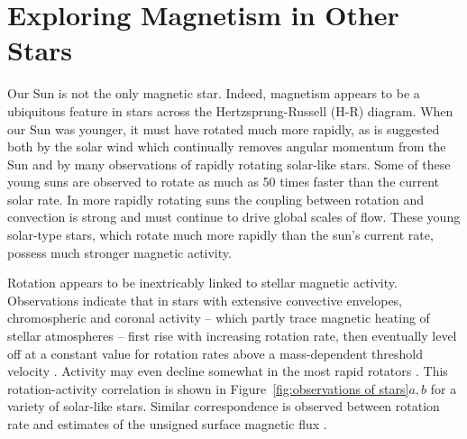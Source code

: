 \section{Exploring Magnetism in Other Stars} 
Our Sun is not the only magnetic star.  Indeed, magnetism appears to be a
ubiquitous feature in stars across the Hertzsprung-Russell (H-R) diagram.  
When our Sun was younger, it must have rotated much more
rapidly, as is suggested both by the solar wind which continually removes
angular momentum from the Sun and by many observations of rapidly
rotating solar-like stars.  Some of these young suns are observed to
rotate as much as 50 times faster than the current solar rate.  
In more rapidly rotating suns the
coupling between rotation and convection is strong and must continue to drive 
global scales of flow.  These young solar-type stars, which rotate
much more rapidly than the sun's current rate, possess much stronger
magnetic activity.   


Rotation appears to be inextricably linked to stellar magnetic activity.
Observations indicate that in stars with extensive convective envelopes,
chromospheric and coronal activity -- which partly trace magnetic heating
of stellar atmospheres -- first rise with increasing rotation rate, then
eventually level off at a constant value for rotation rates above a
mass-dependent threshold velocity \citep[e.g.,][]{Noyes_et_al_1984a, 
Patten&Simon_1996, Delfosse_et_al_1998, Pizzolato_et_al_2003}. Activity may even decline somewhat in the
most rapid rotators \citep[e.g.,][]{James_et_al_2000}.  
This rotation-activity correlation is shown in
Figure~\ref{fig:observations of stars}$a,b$ for a variety of solar-like
stars.  Similar correspondence is
observed between rotation rate and estimates of the unsigned surface
magnetic flux \citep{Saar_1996, Saar_2001, Reiners_et_al_2009}.  

